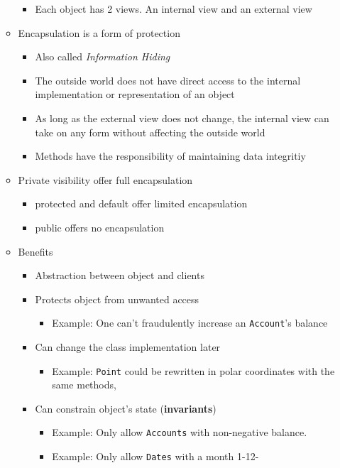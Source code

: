 \documentclass[a4paper]{article}
\newcommand{\inline}[1]{\lstinline!#1!}%
\begin{document}
\begin{itemize}
\begin{itemize}
				\begin{itemize}
					\item Each object has 2 views. An internal view and an external view
				\end{itemize}
			\item Encapsulation is a form of protection
				\begin{itemize}
					\item Also called \textit{Information Hiding}
					\item The outside world does not have direct access to the internal implementation or representation of an object
					\item As long as the external view does not change, the internal view can take on any form without affecting the outside world
					\item Methods have the responsibility of maintaining data integritiy
				\end{itemize}
			\item Private visibility offer full encapsulation
				\begin{itemize}
					\item protected and default offer limited encapsulation
					\item public offers no encapsulation
				\end{itemize}
			\item Benefits
				\begin{itemize}
					\item Abstraction between object and clients
					\item Protects object from unwanted access
						\begin{itemize}
							\item Example: One can't fraudulently increase an \inline{Account}'s balance
						\end{itemize}
						\item Can change the class implementation later
							\begin{itemize}
								\item Example: \inline{Point} could be rewritten in polar coordinates with the same methods,
							\end{itemize}
						\item Can constrain object's state (\textbf{invariants})
							\begin{itemize}
								\item Example: Only allow \inline{Accounts} with non-negative balance.
								\item Example: Only allow \inline{Dates} with a month 1-12-

\end{itemize}
\end{itemize}
\end{itemize}
\end{itemize}
\end{document}
